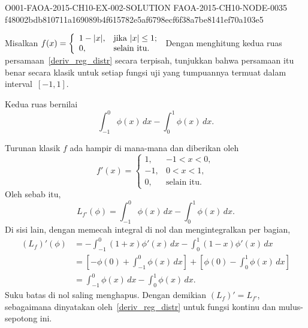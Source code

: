 \begin{o001solution}
  {O001-FAOA-2015-CH10-EX-002-SOLUTION}
  {FAOA-2015-CH10-NODE-0035}
  {f48002bdb810711a169089b4f615782e5af6798ecf6f38a7be8141ef70a103e5}
\begin{o001statement}
Misalkan $f(x) = \left\{
                           \begin{array}{ll}
                             1 - \lvert x\rvert, & \hbox{jika $\lvert x\rvert \le 1$;} \\
                                 0,      & \hbox{selain itu.}
                           \end{array}
                         \right.$ Dengan menghitung kedua ruas persamaan~\eqref{deriv_reg_distr} secara terpisah, tunjukkan bahwa persamaan itu
benar secara klasik untuk setiap fungsi uji yang tumpuannya termuat dalam interval~$[-1,1]$.
\end{o001statement}
\begin{o001answer}
Kedua ruas bernilai
\[
  \int_{-1}^{0}\phi(x)\,dx-\int_{0}^{1}\phi(x)\,dx .
\]
\end{o001answer}
\begin{o001proof}
Turunan klasik $f$ ada hampir di mana-mana dan diberikan oleh
\[
 f'(x)=
 \begin{cases}
  1,&-1<x<0,\\
 -1,&0<x<1,\\
  0,&\text{selain itu}.
 \end{cases}
\]
Oleh sebab itu,
\[
 L_{f'}(\phi)=\int_{-1}^{0}\phi(x)\,dx-
               \int_{0}^{1}\phi(x)\,dx .
\]
Di sisi lain, dengan memecah integral di nol dan mengintegralkan per bagian,
\begin{align*}
 (L_f)'(\phi)
 &=-\int_{-1}^{0}(1+x)\phi'(x)\,dx
   -\int_{0}^{1}(1-x)\phi'(x)\,dx\\
 &=\left[-\phi(0)+\int_{-1}^{0}\phi(x)\,dx\right]
   +\left[\phi(0)-\int_{0}^{1}\phi(x)\,dx\right]\\
 &=\int_{-1}^{0}\phi(x)\,dx-\int_{0}^{1}\phi(x)\,dx.
\end{align*}
Suku batas di nol saling menghapus. Dengan demikian
$(L_f)'=L_{f'}$, sebagaimana dinyatakan oleh~\eqref{deriv_reg_distr} untuk
fungsi kontinu dan mulus-sepotong ini.
\end{o001proof}
\end{o001solution}

